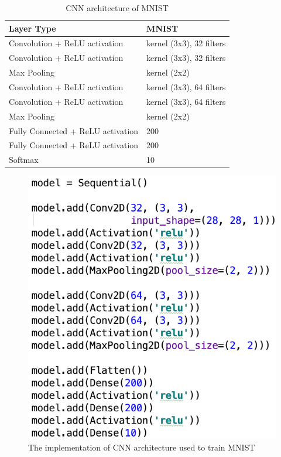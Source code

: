 \documentclass[12pt]{article}
\begin{document}
\begin{table}[H]
	\centering
	\small
	\caption{CNN architecture of MNIST}
	\vspace{6mm}
	\label{tab:CNN-architecture-MNIST}
	\begin{tabular}{|l|l|}
		\hline
		\textbf{Layer Type} & \textbf{MNIST} \\ \hline
		Convolution + ReLU activation & kernel (3x3), 32 filters \\ \hline
		Convolution + ReLU activation & kernel (3x3), 32 filters \\ \hline
		Max Pooling & kernel (2x2) \\ \hline
		Convolution + ReLU activation & kernel (3x3), 64 filters \\ \hline
		Convolution + ReLU activation & kernel (3x3), 64 filters \\ \hline
		Max Pooling & kernel (2x2) \\ \hline
		Fully Connected + ReLU activation & 200 \\ \hline
		Fully Connected + ReLU activation & 200 \\ \hline
		Softmax & 10 \\ \hline
	\end{tabular}%
\end{table}

\begin{figure}[H]
	\centering
	\caption{The implementation of CNN architecture used to train MNIST}
	\label{fig:MNIST-implementation}
	\includegraphics[scale=0.7]{img/MNIST}
\end{figure}
\end{document}
